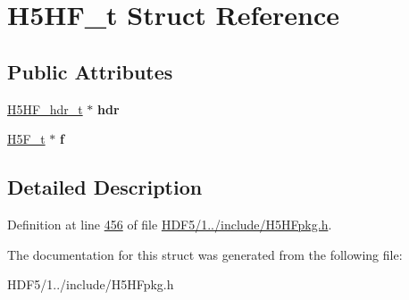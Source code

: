 \hypertarget{struct_h5_h_f__t}{}\section{H5\+H\+F\+\_\+t Struct Reference}
\label{struct_h5_h_f__t}
\subsection*{Public Attributes}
\begin{DoxyCompactItemize}
\item 
\mbox{\label{struct_h5_h_f__t_a51a8c6c1e32bd9c107d6fdd7ee820611}} 
\hyperlink{struct_h5_h_f__hdr__t}{H5\+H\+F\+\_\+hdr\+\_\+t} $\ast$ {\bfseries hdr}
\item 
\mbox{\label{struct_h5_h_f__t_a70f8b18cb0db1edfe1c913ce7fa7ff19}} 
\hyperlink{struct_h5_f__t}{H5\+F\+\_\+t} $\ast$ {\bfseries f}
\end{DoxyCompactItemize}


\subsection{Detailed Description}


Definition at line \hyperlink{_h_d_f5_21_810_81_2include_2_h5_h_fpkg_8h_source_l00456}{456} of file \hyperlink{_h_d_f5_21_810_81_2include_2_h5_h_fpkg_8h_source}{H\+D\+F5/1../include/\+H5\+H\+Fpkg.\+h}.



The documentation for this struct was generated from the following file\+:\begin{DoxyCompactItemize}
\item 
H\+D\+F5/1../include/\+H5\+H\+Fpkg.\+h\end{DoxyCompactItemize}
